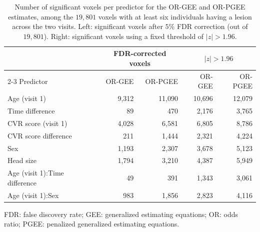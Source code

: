 \begin{table}[htbp]
\centering
\caption{Number of significant voxels per predictor for the OR-GEE and OR-PGEE estimates, among the $19,801$ voxels with at least six individuals having a lesion across the two visits. Left: significant voxels after $5\%$ FDR correction (out of $19,801$). Right: significant voxels using a fixed threshold of $\vert z \vert > 1.96$.}
\label{tab:or-significant-voxels}
\setlength{\tabcolsep}{7pt}
\renewcommand{\arraystretch}{1.15}
\begin{tabular}{lrrrr}
\hline
& \multicolumn{2}{c}{FDR-corrected voxels} & \multicolumn{2}{c}{$|z| > 1.96$} \\
\cline{2-3}\cline{4-5}
Predictor & OR-GEE & OR-PGEE & OR-GEE & OR-PGEE \\ 
\hline
Age (visit 1) & 9,312 & 11,090 & 10,696 & 12,079 \\
Time difference & 89 & 470 & 2,176 & 3,765 \\
CVR score (visit 1) & 4,028 & 6,581 & 6,805 & 8,786 \\
CVR score difference & 211 & 1,444 & 2,321 & 4,224 \\
Sex & 1,193 & 2,307 & 3,678 & 5,123 \\
Head size & 1,794 & 3,210 & 4,387 & 5,949 \\
Age (visit 1):Time difference & 49 & 391 & 1,343 & 3,061 \\
Age (visit 1):Sex & 983 & 1,856 & 2,823 & 4,116 \\
\hline
\end{tabular}

\vspace{0.4em}
\begin{minipage}{0.94\linewidth}
\footnotesize
FDR: false discovery rate; GEE: generalized estimating equations; OR: odds ratio; PGEE: penalized generalized estimating equations.
\end{minipage}
\end{table}
